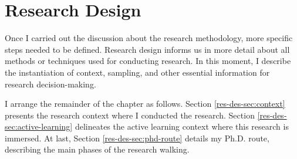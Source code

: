 \chapter{Research Design}
\label{chap:res-design}

 Once I carried out the discussion about the research methodology, more specific steps needed to be defined. Research design informs us in more detail about all methods or techniques used for conducting research. In this moment, I describe the instantiation of context, sampling, and other essential information for research decision-making. 
 
I arrange the remainder of the chapter as follows. Section \ref{res-des-sec:context} presents the research context where I conducted the research. Section \ref{res-des-sec:active-learning} delineates the active learning context where this research is immersed. At last, Section \ref{res-des-sec:phd-route} details my \gls{Ph.D.} route, describing the main phases of the research walking.
